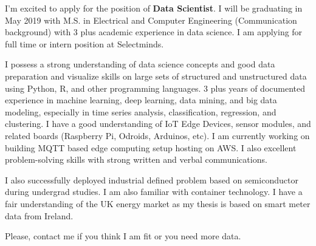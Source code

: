 \documentclass[11pt, a4paper]{ishan-cv} %
\newcommand{\companyname}{Selectminds}
\newcommand{\positionname}{\textbf{Data Scientist}}%
\begin{document}
\makecvheader %
\makelettertitle %


\begin{cvletter}

I’m excited to apply for the position of \textbf{\positionname}. %
I will be graduating in May 2019 with M.S. in Electrical and Computer Engineering (Communication background) with 3 plus academic experience in data science. I am applying for full time or intern position at \companyname.


I possess a strong understanding of data science concepts and good data preparation and visualize skills on large sets of structured and unstructured data using Python, R, and other programming languages. 3 plus years of documented experience in machine learning, deep learning, data mining, and big data modeling, especially in time series analysis, classification, regression, and clustering. I have a good understanding of IoT Edge Devices, sensor modules, and related boards (Raspberry Pi, Odroids, Arduinos, etc). I am currently working on building MQTT based edge computing setup hosting on AWS. I also excellent problem-solving skills with strong written and verbal communications.

I also successfully deployed industrial defined problem based on semiconductor during undergrad studies. I am also familiar with container technology. I have a fair understanding of the UK energy market as my thesis is based on smart meter data from Ireland.


Please, contact me if you think I am fit or you need more data.


\end{cvletter}
\end{document}
